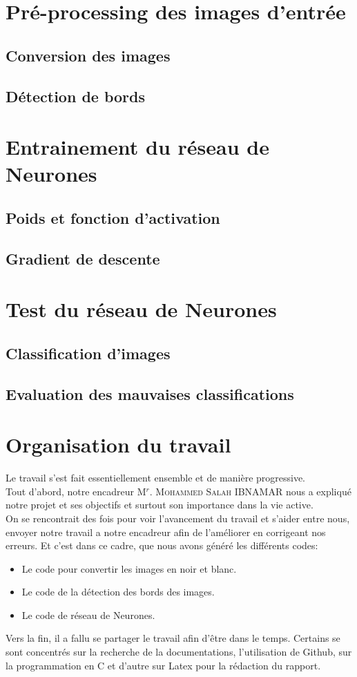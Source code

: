 \documentclass[a4paper,12pt]{report}
\begin{document}
\chapter{Pré-processing des images d'entrée}
\section{Conversion des images}
\section{Détection de bords}


\chapter{Entrainement du réseau de Neurones}
\section{Poids et fonction d'activation}
\section{Gradient de descente}


\chapter{Test du réseau de Neurones}
\section{Classification d'images}
\section{Evaluation des mauvaises classifications}


\chapter{Organisation du travail}
Le travail s’est fait essentiellement ensemble et de manière progressive.\\
Tout d’abord, notre encadreur M$^{r}$. \textsc{Mohammed Salah} IBNAMAR  nous a expliqué notre projet et ses objectifs et surtout son importance dans la vie active.\\
On se rencontrait des fois pour voir l'avancement  du travail et s'aider entre nous, envoyer notre travail a notre encadreur afin de l'améliorer en corrigeant nos erreurs. Et c'est dans ce cadre, que nous avons généré les différents codes:
\begin{itemize}
      \item [\star] Le code pour convertir les images en noir et blanc.
      \item [\star] Le code de la détection des bords des images.
      \item [\star] Le code de réseau de Neurones.
    \end{itemize}
Vers la fin, il a fallu se partager le travail afin d’être dans le temps. Certains se sont concentrés sur la recherche de la documentations, l'utilisation de Github, sur la programmation en C et d’autre sur Latex pour la rédaction du rapport.
\end{document}
